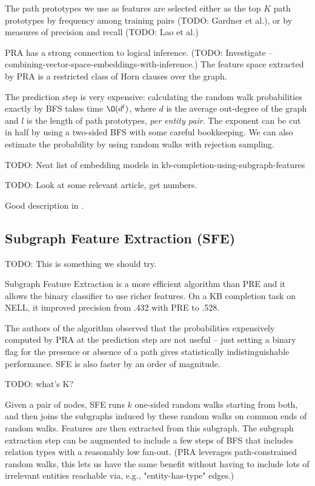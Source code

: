 The path prototypes we use as features are selected either as the top $K$ path
prototypes by frequency among training pairs (TODO: Gardner et al.), or by
measures of precision and recall (TODO: Lao et al.)

PRA has a strong connection to logical inference. (TODO: Investigate --
combining-vector-space-embeddings-with-inference.)
The feature space extracted by PRA is a restricted class of Horn clauses over
the graph.\cite{subgraph-feature-extraction}

The prediction step is very expensive: calculating the random walk
probabilities exactly by BFS takes time $\O(d^l)$, where $d$ is the
average out-degree of the graph and $l$ is the length of path prototypes,
\textit{per entity pair}.
The exponent can be cut in half by using a two-sided BFS with some careful
bookkeeping. We can also estimate the probability by using random walks with
rejection sampling.

TODO: Neat list of embedding models in kb-completion-using-subgraph-features

TODO: Look at some relevant article, get numbers.

Good description in \cite{random-walk-inference}.

\subsection{Subgraph Feature Extraction (SFE)}

TODO: This is something we should try.

Subgraph Feature Extraction\cite{subgraph-feature-extraction} is a more
efficient algorithm than PRE and it allows the binary classifier to use richer
features. On a KB completion task on NELL, it improved precision from .432 with
PRE to .528.


The authors of the algorithm observed that the probabilities expensively
computed by PRA at the prediction step are not
useful\cite{subgraph-feature-extraction} -- just setting a binary flag for the
presence or absence of a path gives statistically indistinguishable performance.
SFE is also faster by an order of magnitude.

TODO: what's K?

Given a pair of nodes, SFE runs $k$ one-sided random walks starting from both,
and then joins the subgraphs induced by these random walks on common ends of
random walks. Features are then extracted from this subgraph.
The subgraph extraction step can be augmented to include a few steps of BFS
that includes relation types with a reasonably low fan-out.
(PRA leverages path-constrained random walks, this lets us have the same
benefit without having to include lots of irrelevant entities reachable via,
e.g., "entity-has-type" edges.)

